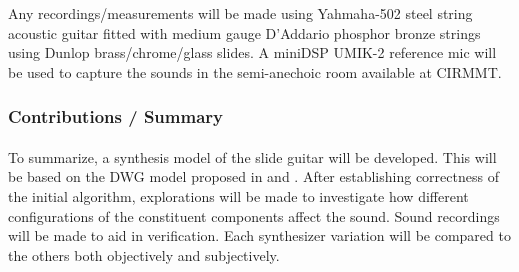 \documentclass[12pt]{article}
\begin{document}
Any recordings/measurements will be made using Yahmaha-502 steel string acoustic guitar fitted with medium gauge D'Addario phosphor bronze strings using Dunlop brass/chrome/glass slides. A miniDSP UMIK-2 reference mic will be used to capture the sounds in the semi-anechoic room available at CIRMMT.

\subsubsection*{Contributions / Summary}
\paragraph{}
To summarize, a synthesis model of the slide guitar will be developed. This will be based on the DWG model proposed in \cite{pakarinen_virtual_2008} and \cite{puputti_real-time_2012}. After establishing correctness of the initial algorithm, explorations will be made to investigate how different configurations of the constituent components affect the sound. Sound recordings will be made to aid in verification. Each synthesizer variation will be compared to the others both objectively and subjectively.

\clearpage
%


\end{document}
